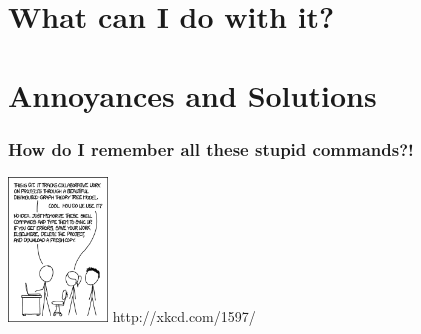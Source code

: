 \documentclass{beamer}
\begin{document}




\section{What can I do with it?}








\section{Annoyances and Solutions}
\begin{frame}[fragile]
\frametitle{How do I remember all these stupid commands?!}
\includegraphics[width=100px]{git.png}
http://xkcd.com/1597/
\end{frame}
\end{document}
